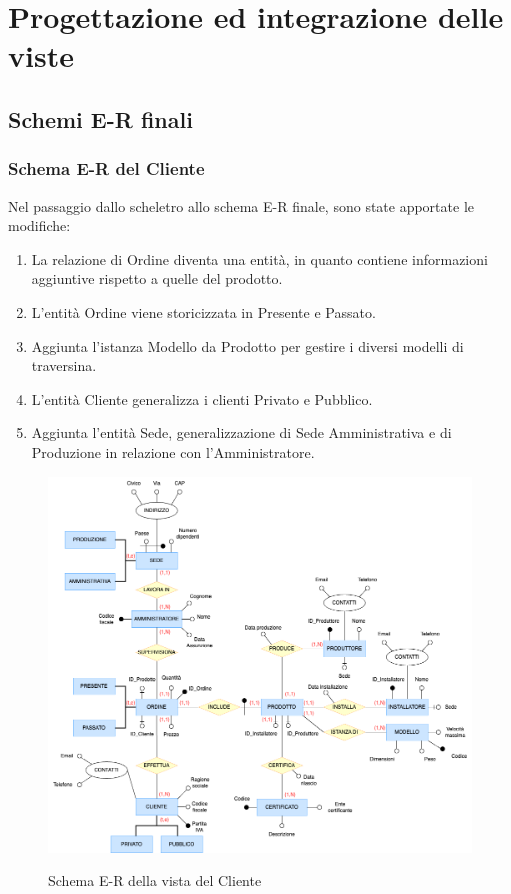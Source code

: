 \documentclass{article}
\begin{document}
\section{Progettazione ed integrazione delle viste}
\subsection{Schemi E-R finali}
\subsubsection{Schema E-R del Cliente}

Nel passaggio dallo scheletro allo schema E-R finale, sono state apportate le modifiche:
\begin{enumerate}
    \item La relazione di Ordine diventa una entità, in quanto contiene informazioni aggiuntive rispetto a quelle del prodotto.
    \item L'entità Ordine viene storicizzata in Presente e Passato.
    \item Aggiunta l'istanza Modello da Prodotto per gestire i diversi modelli di traversina.
    \item L'entità Cliente generalizza i clienti Privato e Pubblico.
    \item Aggiunta l'entità Sede, generalizzazione di Sede Amministrativa e di Produzione in relazione con l'Amministratore.
\end{enumerate}

\begin{figure}[H]
    \centering
    \includegraphics[width=15cm]{images/rivisto_utente.drawio.png}\\
    \caption{Schema E-R della vista del Cliente}
\end{figure}
\end{document}
